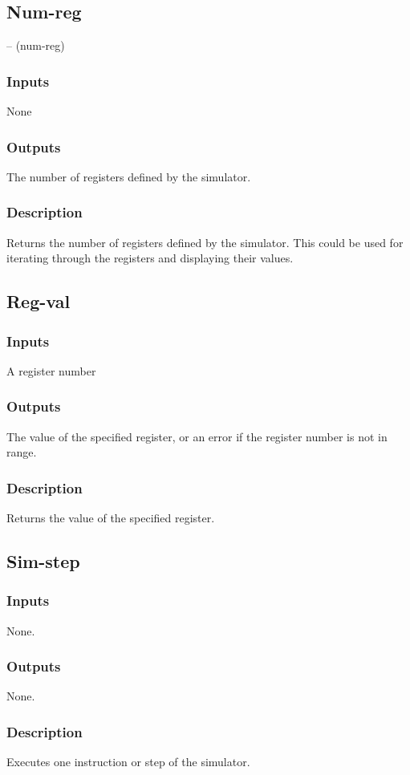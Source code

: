 \documentclass[10pt, openany]{book}
\begin{document}
\subsection{Num-reg}
   --  (num-reg)
\subsubsection{Inputs}
None
\subsubsection{Outputs}
The number of registers defined by the simulator.
\subsubsection{Description}
Returns the number of registers defined by the simulator.  This could be used for iterating through the registers and displaying their values.

\subsection{Reg-val}
\subsubsection{Inputs}
A register number
\subsubsection{Outputs}
The value of the specified register, or an error if the register number is not in range.
\subsubsection{Description}
Returns the value of the specified register.

\subsection{Sim-step}
\subsubsection{Inputs}
None.
\subsubsection{Outputs}
None.
\subsubsection{Description}
Executes one instruction or step of the simulator.
\end{document}
